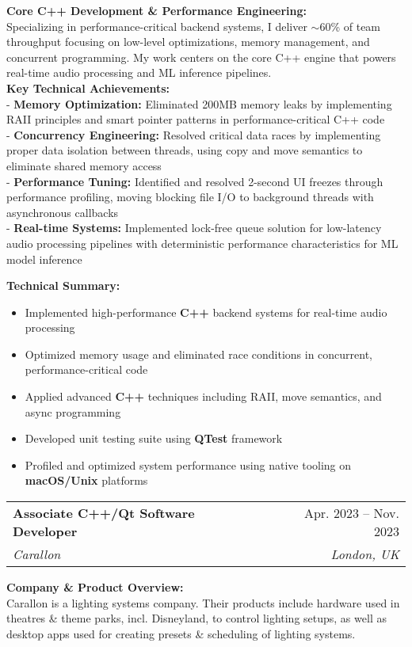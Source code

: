 \documentclass[letterpaper,11pt]{article}
\makeatletter
\newcommand{\resumeItem}[1]{
  \item\small{
    {#1 \vspace{-2pt}}
  }
}
\newcommand{\resumeSubheading}[4]{
  \vspace{-2pt}\item
    \begin{tabular*}{0.97\textwidth}[t]{l@{\extracolsep{\fill}}r}
      \textbf{#1} & #2 \\
      \textit{\small#3} & \textit{\small #4} \\
    \end{tabular*}\vspace{-7pt}
}
\newcommand{\resumeItemListStart}{\begin{itemize}}
\newcommand{\resumeItemListEnd}{\end{itemize}\vspace{-5pt}}
\makeatother
\begin{document}
      \vspace{5pt}
      \textbf{Core C++ Development \& Performance Engineering:}\\
      Specializing in performance-critical backend systems, I deliver $\sim$60\% of team throughput focusing on low-level optimizations, memory management, and concurrent programming. My work centers on the core C++ engine that powers real-time audio processing and ML inference pipelines.\\

      \vspace{5pt}
      \textbf{Key Technical Achievements:}\\
- \textbf{Memory Optimization:} Eliminated 200MB memory leaks by implementing RAII principles and smart pointer patterns in performance-critical C++ code\\
- \textbf{Concurrency Engineering:} Resolved critical data races by implementing proper data isolation between threads, using copy and move semantics to eliminate shared memory access\\
- \textbf{Performance Tuning:} Identified and resolved 2-second UI freezes through performance profiling, moving blocking file I/O to background threads with asynchronous callbacks\\
- \textbf{Real-time Systems:} Implemented lock-free queue solution for low-latency audio processing pipelines with deterministic performance characteristics for ML model inference

      \vspace{5pt}
      \textbf{Technical Summary:}
      \resumeItemListStart
        \resumeItem{Implemented high-performance \textbf{C++} backend systems for real-time audio processing}
        \resumeItem{Optimized memory usage and eliminated race conditions in concurrent, performance-critical code}
        \resumeItem{Applied advanced \textbf{C++} techniques including RAII, move semantics, and async programming}
        \resumeItem{Developed unit testing suite using \textbf{QTest} framework}
        \resumeItem{Profiled and optimized system performance using native tooling on \textbf{macOS/Unix} platforms}
      \resumeItemListEnd


\vspace{10pt}
\resumeSubheading
    {Associate C++/Qt Software Developer}{Apr. 2023 -- Nov. 2023}
      {Carallon}{London, UK}

      
\vspace{10pt}
      \textbf{Company \& Product Overview:}\\
      Carallon is a lighting systems company. Their products include hardware used in theatres \& theme parks, incl. Disneyland, to control lighting setups, as well as desktop apps used for creating presets \& scheduling of lighting systems.\\
      
\end{document}
